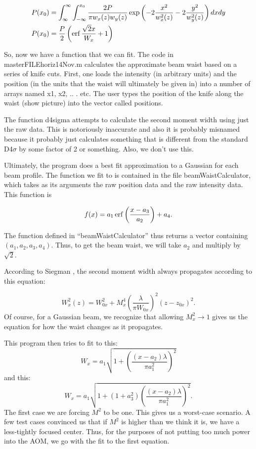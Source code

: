 \begin{align}
P(x_0)&=\int_{\infty}^{\infty}\int_{-\infty}^{x_0} \frac{2 P}{\pi w_x(z) w_y(z)}\exp \left(-2\frac{x^2}{w_x^2(z)}-2\frac{y^2}{w_y^2(z)}\right) dx dy\\
P(x_0)&=\frac{P}{2} \left(\operatorname{erf} \frac{\sqrt{2} x}{W_x}+1 \right)
\end{align}

So, now we have a function that we can fit. The code in masterFILEhoriz14Nov.m calculates the approximate beam waist based on a series of knife cuts. First, one loads the intensity (in arbitrary units) and the position (in the units that the waist will ultimately be given in) into a number of arrays named x1, x2, .. . etc. The user types the position of the knife along the waist (show picture) into the vector called positions. 

The function d4sigma attempts to calculate the second moment width using just the raw data. This is notoriously inaccurate and also it is probably misnamed because it probably just calculates something that is different from the standard D4$\sigma$ by some factor of 2 or something. Also, we don't use this. 

Ultimately, the program does a best fit approximation to a Gaussian for each beam profile. The function we fit to is contained in the file beamWaistCalculator, which takes as its arguments the raw position data and the raw intensity data. This function is 

\begin{equation}
f(x)=a_1 \operatorname{erf} \left(\frac{x-a_3}{a_2}\right)+a_4.
\end{equation}

The function defined in ``beamWaistCalculator'' thus returns a vector containing $(a_1, a_2, a_3, a_4)$. Thus, to get the beam waist, we will take $a_2$ and multiply by $\sqrt{2}$. 

According to Siegman \cite{SiegmanBeamQuality}, the second moment width always propagates according to this equation: 

\begin{equation}
W_x^2(z)=W_{0x}^2 + M_x^4 \left( \frac{\lambda}{\pi W_{0x}}\right)^2 (z-z_{0x})^2. 
\end{equation}
Of course, for a Gaussian beam, we recognize that allowing $M_x^2\rightarrow 1$ gives us the equation for how the waist changes as it propagates. 

This program then tries to fit to this:
\begin{equation}
W_x=a_1 \sqrt{1+\left(\frac{(x-a_2) \lambda}{\pi a_1^2}\right)^2}
\end{equation}
and this:
\begin{equation}
W_x=a_1 \sqrt{1+(1+a_3^2) \left(\frac{(x-a_2) \lambda}{\pi a_1^2}\right)^2}. 
\end{equation}
The first case we are forcing $M^2$ to be one. This gives us a worst-case scenario. A few test cases convinced us that if $M^2$ is higher than we think it is, we have a less-tightly focused center. Thus, for the purposes of not putting too much power into the AOM, we go with the fit to the first equation. 


